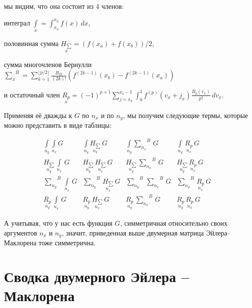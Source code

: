 \documentclass[11pt]{article}
\begin{document}
мы видим, что она состоит из 4 членов:

интеграл \(\int\limits_{x}^{}=\int _{x_a}^{x_b}f(x)\,dx\),

половинная сумма
\(\underset{x}{H_{\sum}}={\left( {f(x_a)+f(x_b)}\right)/{2}}\),

сумма многочленов Бернулли
\({\sum\limits_{x}^{}}^{B}=\sum _{k=1}^{\lfloor p/2\rfloor }{\frac {B_{2k}}{(2k)!}}\left(f^{(2k-1)}(x_b)-f^{(2k-1)}(x_a)\right)\)

и остаточный член
\(\underset{x}{R_{p}}=(-1)^{p+1}\sum_{j=x_a}^{x_b-1} \int _{0}^{1}f^{(p)}(v_x+j_x){\frac {B_{p}(v_x)}{p!}}\,dv_x\).

Применяя её дважды к \(G\) по \(n_x\) и по \(n_y\), мы получим следующие
термы, которые можно представить в виде таблицы:

    \begin{equation}
\begin{array}{cccc}
 \int\limits_{n_y}^{} \int\limits_{n_x}^{} G  &  \int\limits_{n_y}^{} \underset{n_x}{H_{\sum}}\,G  &  \int\limits_{n_y}^{}{\sum\limits_{n_x}^{}}^{B}\,G  &  \int\limits_{n_y}^{}\,\underset{n_x}{R_{p}}\,G  \\
 \underset{n_y}{H_{\sum}}\,\int\limits_{n_x}^{}\,G &  \underset{n_y}{H_{\sum}}\,\underset{n_x}{H_{\sum}}\,G &  \underset{n_y}{H_{\sum}}\,{\sum\limits_{n_x}^{}}^{B}\,G &  \underset{n_y}{H_{\sum}}\,\underset{n_x}{R_{p}}\,G \\
 {\sum\limits_{n_y}^{}}^{B}\,\int\limits_{n_x}^{}\,G  &  {\sum\limits_{n_y}^{}}^{B}\,\underset{n_x}{H_{\sum}}\,G  &  {\sum\limits_{n_y}^{}}^{B}\,{\sum\limits_{n_x}^{}}^{B}\,G  &  {\sum\limits_{n_y}^{}}^{B}\,\underset{n_x}{R_{p}}\,G  \\
 \underset{n_y}{R_{p}}\,\int\limits_{n_x}^{}\,G   &  \underset{n_y}{R_{p}}\,\underset{n_x}{H_{\sum}}\,G   &  \underset{n_y}{R_{p}}\,{\sum\limits_{n_x}^{}}^{B}\,G   &  \underset{n_y}{R_{p}}\,\underset{n_x}{R_{p}}\,G
\end{array}\end{equation}

    А учитывая, что у нас есть функция \(G\), симметричная относительно
своих аргументов \(n_x\) и \(n_y\), значит, приведенная выше двумерная
матрица Эйлера--Маклорена тоже симметрична.

    \section{Сводка двумерного Эйлера --
Маклорена}\label{ux441ux432ux43eux434ux43aux430-ux434ux432ux443ux43cux435ux440ux43dux43eux433ux43e-ux44dux439ux43bux435ux440ux430-ux43cux430ux43aux43bux43eux440ux435ux43dux430}
\end{document}
